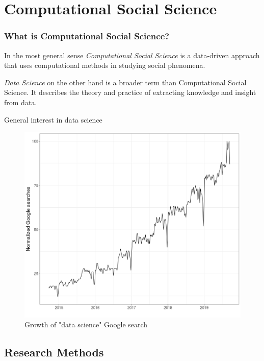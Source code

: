 \documentclass{beamer}
\begin{document}
\section[CSS]{Computational Social Science}

\begin{frame}
    \frametitle{What is Computational Social Science?}
    \begin{definition}{}
        In the most general sense \emph{Computational Social Science} is a data-driven approach that uses computational methods in studying social phenomena.
    \end{definition}
    \begin{definition}{}
        \emph{Data Science} on the other hand is a broader term than Computational Social Science. It describes the theory and practice of extracting knowledge and insight from data.
    \end{definition}
\end{frame}

\begin{frame}{General interest in data science}
    \begin{figure}
    \includegraphics[width = .8\framewidth]{png/ds-searches.png}
    \caption{Growth of "data science" Google search}
    \end{figure}
\end{frame}

\subsection{Research Methods}
\end{document}
